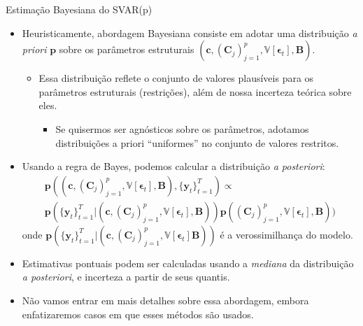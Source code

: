 \documentclass[11pt]{beamer}
\begin{document}
\begin{frame}{Estimação Bayesiana do SVAR(p)}
	\begin{itemize}
	 	\item Heuristicamente, abordagem Bayesiana consiste em adotar uma distribuição \textit{a priori} $\boldsymbol{p}$ sobre os parâmetros estruturais $(\boldsymbol{c}, (\boldsymbol{C}_j)_{j=1}^p,\mathbb{V}[\boldsymbol{\epsilon}_t], \boldsymbol{B})$.
		\begin{itemize}
			\item Essa distribuição reflete o conjunto de valores plausíveis para os parâmetros estruturais (restrições), além de nossa incerteza teórica sobre eles.
			\begin{itemize}
				\item Se quisermos ser agnósticos sobre os parâmetros, adotamos distribuições a priori ``uniformes'' no conjunto de valores restritos.
			\end{itemize}
		\end{itemize}
		\item Usando a regra de Bayes, podemos calcular {\color{blue}a distribuição \textit{a posteriori}}:
		\begin{equation*}
			\begin{aligned}
				\boldsymbol{p}((\boldsymbol{c}, (\boldsymbol{C}_j)_{j=1}^p, \mathbb{V}[\boldsymbol{\epsilon}_t], \boldsymbol{B}), \{\boldsymbol{y}_t\}_{t=1}^T) \propto \\ \boldsymbol{p}(\{\boldsymbol{y}_t\}_{t=1}^T|(\boldsymbol{c}, (\boldsymbol{C}_j)_{j=1}^p,\mathbb{V}[\boldsymbol{\epsilon}_t], \boldsymbol{B})) \boldsymbol{p}((\boldsymbol{C}_j)_{j=1}^p,\mathbb{V}[\boldsymbol{\epsilon}_t], \boldsymbol{B})) 
			\end{aligned}
		\end{equation*}
		onde $\boldsymbol{p}(\{\boldsymbol{y}_t\}_{t=1}^T|(\boldsymbol{c}, (\boldsymbol{C}_j)_{j=1}^p,\mathbb{V}[\boldsymbol{\epsilon}_t]\boldsymbol{B}))$ é a verossimilhança do modelo.
		\item Estimativas pontuais podem ser calculadas usando a \textit{mediana} da distribuição \textit{a posteriori}, e incerteza a partir de seus quantis.
		\item Não vamos entrar em mais detalhes sobre essa abordagem, embora enfatizaremos casos em que esses métodos são usados.
	\end{itemize}
\end{frame}
\end{document}
